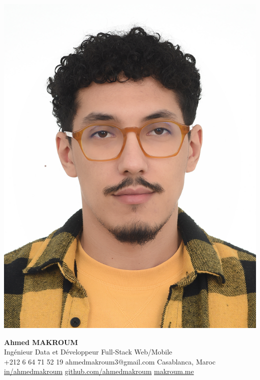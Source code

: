 \documentclass[12pt,a4paper,sans]{moderncv}
\begin{document}
    \begin{minipage}{0.15\textwidth}
        \includegraphics[width=\linewidth]{images/ahmed.jpg}
    \end{minipage}
    \hfill
    \begin{minipage}{0.82\textwidth}
        \centering
        {\fontsize{25}{28}\selectfont\textbf{Ahmed MAKROUM}}\\[0.3em]
        {\fontsize{15}{18}\selectfont Ingénieur Data et Développeur Full-Stack Web/Mobile} \\[0.4em]
        {\fontsize{11}{13}\selectfont
            \faMobile\enspace +212 6 64 71 52 19 \quad
            \faEnvelope\enspace ahmedmakroum3@gmail.com \quad
            \faHome\enspace Casablanca, Maroc \\[0.3em]
            \faLinkedin\enspace \href{https://www.linkedin.com/in/ahmed-makroum/}{in/ahmedmakroum} \quad
            \faGithub\enspace \href{https://github.com/ahmedmakroum}{github.com/ahmedmakroum} \quad
            \faGlobe\enspace \href{https://ahmedmakroum.github.io/AhmedMakroumPortfolio/}{makroum.me}
        }
    \end{minipage}
\end{document}
